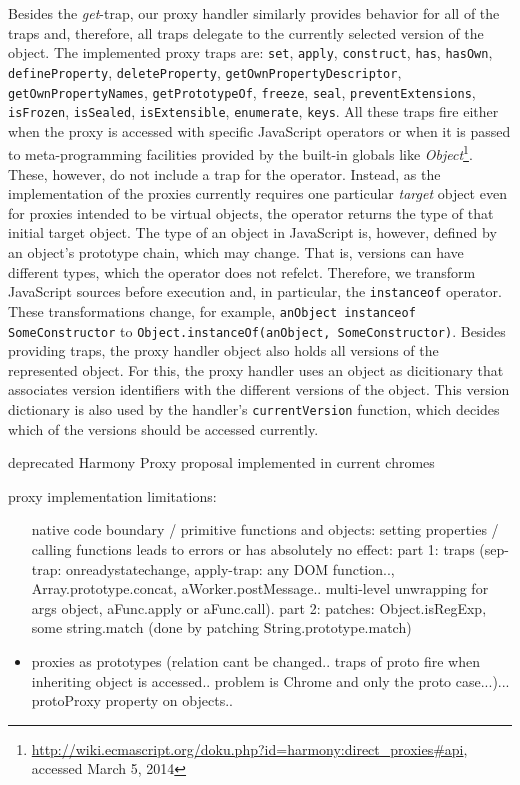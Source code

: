 Besides the \emph{get}-trap, our proxy handler similarly provides behavior for all of the traps and, therefore, all traps delegate to the currently selected version of the object.
The implemented proxy traps are: \lstinline{set}, \lstinline{apply}, \lstinline{construct}, \lstinline{has}, \lstinline{hasOwn}, \lstinline{defineProperty}, \lstinline{deleteProperty}, \lstinline{getOwnPropertyDescriptor}, \lstinline{getOwnPropertyNames}, \lstinline{getPrototypeOf}, \lstinline{freeze}, \lstinline{seal}, \lstinline{preventExtensions}, \lstinline{isFrozen}, \lstinline{isSealed}, \lstinline{isExtensible}, \lstinline{enumerate}, \lstinline{keys}.
All these traps fire either when the proxy is accessed with specific JavaScript operators or when it is passed to meta-programming facilities provided by the built-in globals like \emph{Object}\footnote{\url{http://wiki.ecmascript.org/doku.php?id=harmony:direct_proxies\#api}, accessed March 5, 2014}.
These, however, do not include a trap for the  operator.
Instead, as the implementation of the proxies currently requires one particular \emph{target} object even for proxies intended to be virtual objects, the  operator returns the type of that initial target object.
The type of an object in JavaScript is, however, defined by an object's prototype chain, which may change.
That is, versions can have different types, which the  operator does not refelct.
Therefore, we transform JavaScript sources before execution and, in particular, the \lstinline{instanceof} operator.
These transformations change, for example, \lstinline{anObject instanceof SomeConstructor} to \lstinline{Object.instanceOf(anObject, SomeConstructor)}.
Besides providing traps, the proxy handler object also holds all versions of the represented object.
For this, the proxy handler uses an object as dicitionary that associates version identifiers with the different versions of the object.
This version dictionary is also used by the handler's \lstinline{currentVersion} function, which decides which of the versions should be accessed currently.


deprecated Harmony Proxy proposal implemented in current chromes

proxy implementation limitations:

\begin{itemize}
    \item [native code] boundary / primitive functions and objects: setting properties / calling functions leads to errors or has absolutely no effect: part 1: traps (sep-trap: onreadystatechange, apply-trap: any DOM function.., Array.prototype.concat, aWorker.postMessage.. multi-level unwrapping for args object, aFunc.apply or aFunc.call).
part 2: patches: Object.isRegExp, some string.match (done by patching String.prototype.match)
    \item proxies as prototypes (relation cant be changed.. traps of proto fire when inheriting object is accessed.. problem is Chrome and only the proto case...)... protoProxy property on objects..
\end{itemize}










